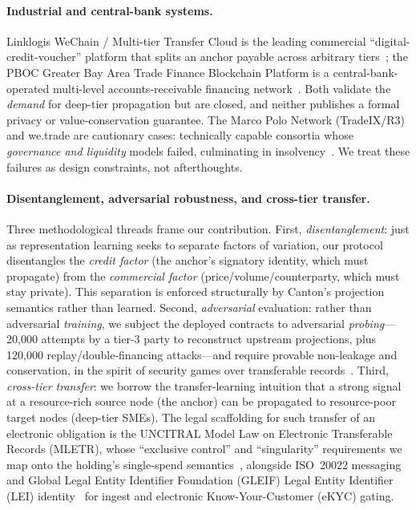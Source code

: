 \documentclass[10pt,twocolumn,letterpaper]{article}
\begin{document}
\paragraph{Industrial and central-bank systems.} Linklogis WeChain / Multi-tier
Transfer Cloud is the leading commercial ``digital-credit-voucher'' platform that
splits an anchor payable across arbitrary tiers~\cite{linklogis2021}; the PBOC
Greater Bay Area Trade Finance Blockchain Platform is a central-bank-operated
multi-level accounts-receivable financing network~\cite{pboc2020}. Both validate the
\emph{demand} for deep-tier propagation but are closed, and neither publishes a
formal privacy or value-conservation guarantee. The Marco Polo Network (TradeIX/R3)
and we.trade are cautionary cases: technically capable consortia whose
\emph{governance and liquidity} models failed, culminating in
insolvency~\cite{marcopolo2022,wetrade2022}. We treat these failures as design
constraints, not afterthoughts.

\paragraph{Disentanglement, adversarial robustness, and cross-tier transfer.} Three
methodological threads frame our contribution. First, \emph{disentanglement}: just as
representation learning seeks to separate factors of variation, our protocol
disentangles the \emph{credit factor} (the anchor's signatory identity, which must
propagate) from the \emph{commercial factor} (price/volume/counterparty, which must
stay private). This separation is enforced structurally by Canton's projection
semantics rather than learned. Second, \emph{adversarial} evaluation: rather than
adversarial \emph{training}, we subject the deployed contracts to adversarial
\emph{probing}---20{,}000 attempts by a tier-3 party to reconstruct upstream
projections, plus 120{,}000 replay/double-financing attacks---and require provable
non-leakage and conservation, in the spirit of security games over
transferable records~\cite{bensasson2014}. Third, \emph{cross-tier transfer}: we
borrow the transfer-learning intuition that a strong signal at a resource-rich source
node (the anchor) can be propagated to resource-poor target nodes (deep-tier SMEs).
The legal scaffolding for such transfer of an electronic obligation is the UNCITRAL
Model Law on Electronic Transferable Records (MLETR), whose ``exclusive control'' and
``singularity'' requirements we map onto the holding's single-spend
semantics~\cite{mletr2017}, alongside ISO~20022 messaging~\cite{iso20022} and Global
Legal Entity Identifier Foundation (GLEIF) Legal Entity Identifier (LEI)
identity~\cite{gleif2018} for ingest and electronic Know-Your-Customer (eKYC) gating.
\end{document}
